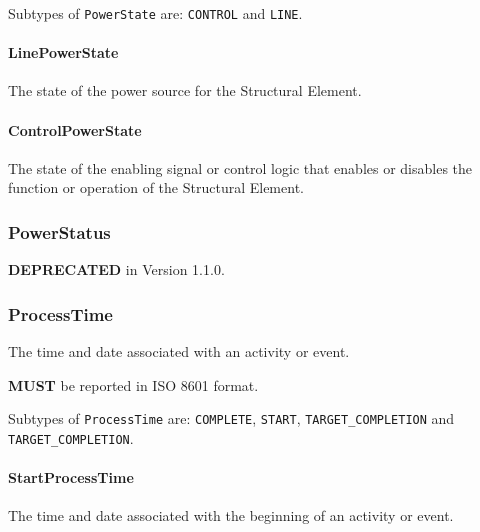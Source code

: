 \FloatBarrier

Subtypes of \texttt{PowerState} are: \texttt{CONTROL} and \texttt{LINE}. 
\FloatBarrier

\paragraph{LinePowerState}\mbox{}
\label{sec:LinePowerState}



The state of the power source for the \gls{Structural Element}.


\paragraph{ControlPowerState}\mbox{}
\label{sec:ControlPowerState}



The state of the enabling signal or control logic that enables or disables the function or operation of the \gls{Structural Element}.


\subsubsection{PowerStatus}
\label{sec:PowerStatus}



\textbf{DEPRECATED} in Version 1.1.0.

\FloatBarrier

\subsubsection{ProcessTime}
\label{sec:ProcessTime}



The time and date associated with an activity or event.
  
  \textbf{MUST} be reported in ISO 8601 format.


Subtypes of \texttt{ProcessTime} are: \texttt{COMPLETE}, \texttt{START}, \texttt{TARGET_COMPLETION} and \texttt{TARGET_COMPLETION}. 
\FloatBarrier

\paragraph{StartProcessTime}\mbox{}
\label{sec:StartProcessTime}



The time and date associated with the beginning of an activity or event.


